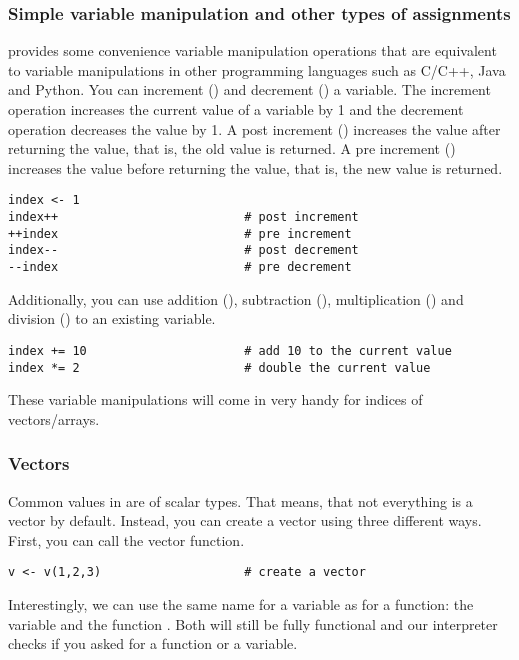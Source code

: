 \subsubsection{Simple variable manipulation and other types of assignments}
\Rev provides some convenience variable manipulation operations that are equivalent to variable manipulations in other programming languages such as C/C++, Java and Python.
You can increment (\cl{++}) and decrement (\cl{--}) a variable.
The increment operation increases the current value of a variable by 1 and the decrement operation decreases the value by 1.
A post increment () increases the value after returning the value, that is, the old value is returned.
A pre increment () increases the value before returning the value, that is, the new value is returned.
{\tt \begin{snugshade*}
\begin{lstlisting}    
index <- 1
index++                          # post increment
++index                          # pre increment
index--                          # post decrement
--index                          # pre decrement
\end{lstlisting}
\end{snugshade*}}
Additionally, you can use addition (), subtraction (), multiplication () and division () to an existing variable.
{\tt \begin{snugshade*}
\begin{lstlisting}    
index += 10                      # add 10 to the current value
index *= 2                       # double the current value
\end{lstlisting}
\end{snugshade*}}
These variable manipulations will come in very handy for indices of vectors/arrays.

\subsubsection{Vectors}
Common values in \RevBayes are of scalar types.
That means, that not everything is a vector by default.
Instead, you can create a vector using three different ways.
First, you can call the vector function.
{\tt \begin{snugshade*}
\begin{lstlisting}    
v <- v(1,2,3)                    # create a vector
\end{lstlisting}
\end{snugshade*}}
Interestingly, we can use the same name for a variable as for a function: the variable  and the function .
Both will still be fully functional and our interpreter checks if you asked for a function or a variable.

